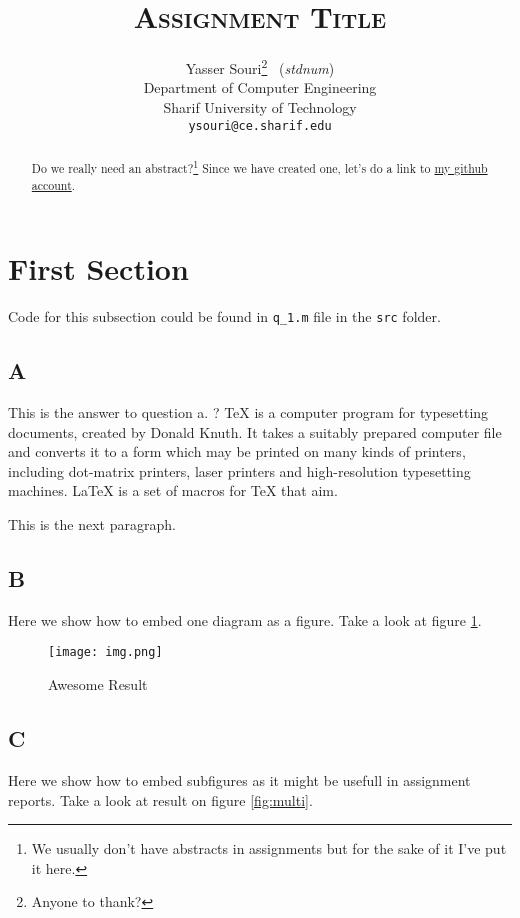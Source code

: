 \documentclass[11pt,a4paper]{article}
\title{\textsc{Assignment Title}}
\author{	Yasser Souri\thanks{Anyone to thank?} \ (\textit{stdnum}) \\
		Department of Computer Engineering\\
		Sharif University of Technology\\
		\texttt{ysouri@ce.sharif.edu}}
\date{}
\begin{document}
\maketitle

\begin{abstract}
Do we really need an abstract?\footnote{We usually don't have abstracts in assignments but for the sake of it I've put it here.}
Since we have created one, let's do a link to \href{https://github.com/yassersouri}{my github account}.
\end{abstract}


\section{First Section}

Code for this subsection could be found in \texttt{q\_1.m} file in the \texttt{src} folder.

\subsection{A}
This is the answer to question a. ? %
\TeX{} is a computer program for typesetting documents, created by Donald Knuth. It takes a suitably prepared computer file and converts it to a form which may be printed on many kinds of printers, including dot-matrix printers, laser printers and high-resolution typesetting machines. \LaTeX{} is a set of macros for \TeX{} that aim.

This is the next paragraph.
\subsection{B}
Here we show how to embed one diagram as a figure. Take a look at figure \ref{fig:awesome_result}.

\begin{figure}[!h] %
    \centering
    \texttt{[image: img.png]}
    \caption{Awesome Result}
    \label{fig:awesome_result}
\end{figure}


\subsection{C}
Here we show how to embed subfigures as it might be usefull in assignment reports. Take a look at result on figure \ref{fig:multi}.
\end{document}
